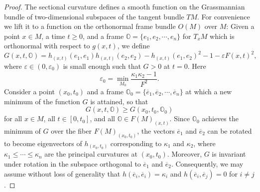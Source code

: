 \documentclass[10pt,a4paper]{amsart}
\begin{document}
\begin{proof}
	The sectional curvature defines a smooth function on the Grassmannian bundle of two-dimensional subspaces of the tangent bundle $TM$. For convenience we lift it to a function on the orthonormal frame bundle $O(M)$ over $M$: Given a point $x\in M$, a time $t\geq 0$, and a frame $\mathbb{O}=\{e_1,e_2,\cdots,e_n\}$ for $T_x M$ which is orthonormal with respect to $g(x,t)$, we define
	\begin{equation*}
		G(x,t,\mathbb{O}) = h_{(x,t)}(e_1,e_1)h_{(x,t)}(e_2,e_2) - h_{(x,t)}(e_1,e_2)^2 - 1- \varepsilon F(x,t)^2,
	\end{equation*}
    where $\varepsilon\in(0,\varepsilon_0)$ is small enough such that $G>0$ at $t=0$. Here
    \begin{equation*}
    	\varepsilon_0 = \min\limits_{M_0}\dfrac{\kappa_1\kappa_2-1}{F^2}.
    \end{equation*}
    Consider a point $(x_0,t_0)$ and a frame $\mathbb{O}_0=\{\overline{e}_1,\overline{e}_2,\cdots,\overline{e}_n\}$ at which a new minimum of the function $G$ is attained, so that $$G(x,t,\mathbb{O})\geq G(x_0,t_0,\mathbb{O}_0)$$
    for all $x\in M$, all $t\in [0,t_0]$, and all $\mathbb{O}\in F(M)_{(x,t)}$. Since $\mathbb{O}_0$ achieves the minimum of $G$ over the fiber $F(M)_{(x_0,t_0)}$, the vectors $\overline{e}_1$ and $\overline{e}_2$ can be rotated to become eigenvectors of $h_{(x_0,t_0)}$ corresponding to $\kappa_1$ and $\kappa_2$, where $\kappa_1\leq\cdots\leq \kappa_n$ are the principal curvatures at $(x_0,t_0)$. Moreover, $G$ is invariant under rotation in the subspace orthogonal to $\overline{e}_1$ and $\overline{e}_2$. Consequently, we may assume without loss of generality that $h(\overline{e}_i,\overline{e}_i)=\kappa_i$ and $h(\overline{e}_i,\overline{e}_j)=0$ for $i\neq j$.
    

\end{proof}
\end{document}
